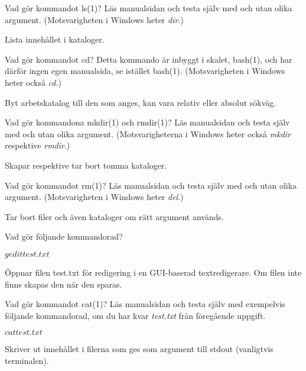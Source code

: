 \documentclass[a4paper]{miunasgn}
\begin{document}
\begin{questions}
	\question\label{q:ls}
	Vad gör kommandot ls(1)?
	Läs manualsidan och testa själv med och utan olika argument.
	(Motsvarigheten i Windows heter \emph{dir}.)
	\begin{solution}
		Lista innehållet i kataloger.
	\end{solution}

	\question\label{q:cd}
	Vad gör kommandot cd?
	Detta kommando är inbyggt i skalet, bash(1), och har därför ingen egen 
	manualsida, se istället bash(1).
	(Motsvarigheten i Windows heter också \emph{cd}.)
	\begin{solution}
		Byt arbetskatalog till den som anges, kan vara relativ eller absolut 
		sökväg.
	\end{solution}

	\question\label{q:mkdir}
	Vad gör kommandona mkdir(1) och rmdir(1)?
	Läs manualsidan och testa själv med och utan olika argument.
	(Motsvarigheterna i Windows heter också \emph{mkdir} respektive 
	\emph{rmdir}.)
	\begin{solution}
		Skapar respektive tar bort tomma kataloger.
	\end{solution}

	\question\label{q:rm}
	Vad gör kommandot rm(1)?
	Läs manualsidan och testa själv med och utan olika argument.
	(Motsvarigheten i Windows heter \emph{del}.)
	\begin{solution}
		Tar bort filer och även kataloger om rätt argument används.
	\end{solution}

	\question\label{q:gedit}
	Vad gör följande kommandorad?
	\begin{terminal}
$ gedit test.txt
$
	\end{terminal}
	\begin{solution}
		Öppnar filen test.txt för redigering i en GUI-baserad textredigerare.
		Om filen inte finns skapas den när den sparas.
	\end{solution}

	\question\label{q:cat}
	Vad gör kommandot cat(1)?
	Läs manualsidan och testa själv med exempelvis följande kommandorad, om du 
	har kvar \emph{test.txt} från föregående uppgift.
	\begin{terminal}
$ cat test.txt
$
	\end{terminal}
	\begin{solution}
		Skriver ut innehållet i filerna som ges som argument till stdout 
		(vanligtvis terminalen).
	\end{solution}


\end{questions}
\end{document}
